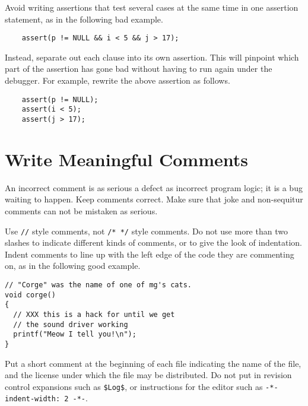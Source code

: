 \documentclass{lulu}
\newcommand{\code}[1]{\texttt{#1}\xspace}
\begin{document}
Avoid writing assertions that test several cases at the same time in
one assertion statement, as in the following bad example.

\begin{samepage}
\begin{verbatim}
    assert(p != NULL && i < 5 && j > 17);
\end{verbatim}
\end{samepage}

Instead, separate out each clause into its own assertion.  This will
pinpoint which part of the assertion has gone bad without having to
run again under the debugger.  For example, rewrite the above
assertion as follows.

\begin{samepage}
\begin{verbatim}
    assert(p != NULL);
    assert(i < 5);
    assert(j > 17);
\end{verbatim}
\end{samepage}

\section{Write Meaningful Comments}

An incorrect comment is as serious a defect as incorrect program
logic; it is a bug waiting to happen.  Keep comments correct.  Make
sure that joke and non-sequitur comments can not be mistaken as
serious.

Use \code{//} style comments, not \code{/* */} style comments.  Do not
use more than two slashes to indicate different kinds of comments, or
to give the look of indentation.  Indent comments to line up with the
left edge of the code they are commenting on, as in the following good
example.

\begin{samepage}
\begin{verbatim}
// "Corge" was the name of one of mg's cats.
void corge()
{
  // XXX this is a hack for until we get 
  // the sound driver working
  printf("Meow I tell you!\n");
}
\end{verbatim}
\end{samepage}

Put a short comment at the beginning of each file indicating the name
of the file, and the license under which the file may be distributed.
Do not put in revision control expansions such as \code{\$Log\$}, or
instructions for the editor such as \code{-*- indent-width: 2 -*-}.
\end{document}
